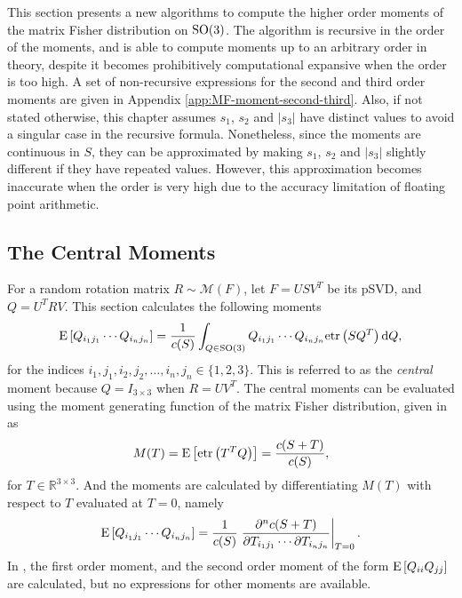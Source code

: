 This section presents a new algorithms to compute the higher order moments of the matrix Fisher distribution on $\mathrm{SO}(3)$.
The algorithm is recursive in the order of the moments, and is able to compute moments up to an arbitrary order in theory, despite it becomes prohibitively computational expansive when the order is too high.
A set of non-recursive expressions for the second and third order moments are given in Appendix \ref{app:MF-moment-second-third}.
Also, if not stated otherwise, this chapter assumes $s_1$, $s_2$ and $|s_3|$ have distinct values to avoid a singular case in the recursive formula.
Nonetheless, since the moments are continuous in $S$, they can be approximated by making $s_1$, $s_2$ and $|s_3|$ slightly different if they have repeated values.
However, this approximation becomes inaccurate when the order is very high due to the accuracy limitation of floating point arithmetic.

\subsection{The Central Moments}

For a random rotation matrix $R\sim\mathcal{M}(F)$, let $F=USV^T$ be its pSVD, and $Q = U^TRV$.
This section calculates the following moments
\begin{align} \label{eqn:MF-moment-int}
	\mathrm{E}\left[ Q_{i_1j_1} \cdots Q_{i_nj_n} \right] = \frac{1}{c(S)} \int_{Q\in\mathrm{SO}(3)} Q_{i_1j_1} \cdots Q_{i_nj_n} \mathrm{etr}\left( SQ^T \right) \mathrm{d} Q,
\end{align}
for the indices $i_1,j_1,i_2,j_2,\ldots, i_n,j_n\in\{1,2,3\}$.
This is referred to as the \textit{central} moment because $Q=I_{3\times 3}$ when $R= UV^T$.
The central moments can be evaluated using the moment generating function of the matrix Fisher distribution, given in \cite{khatri1977mises,lee2018bayesian} as
\begin{equation}
	M(T) = \mathrm{E}\left[ \mathrm{etr}\left( T^TQ \right) \right] = \frac{c(S+T)}{c(S)},
\end{equation}
for $T\in\mathbb{R}^{3\times 3}$. 
And the moments are calculated by differentiating $M(T)$ with respect to $T$ evaluated at $T=0$, namely
\begin{equation} \label{eqn:MF-moment-dcdT}
	\mathrm{E}\left[ Q_{i_1j_1} \cdots Q_{i_nj_n} \right] = \frac{1}{c(S)} \left. \frac{\partial^n c(S+T)}{\partial T_{i_1j_1} \cdots \partial T_{i_nj_n}} \right|_{T=0}.
\end{equation}
In \cite{lee2018bayesian,khatri1977mises}, the first order moment, and the second order moment of the form $\mathrm{E}\left[ Q_{ii}Q_{jj} \right]$ are calculated, but no expressions for other moments are available.

